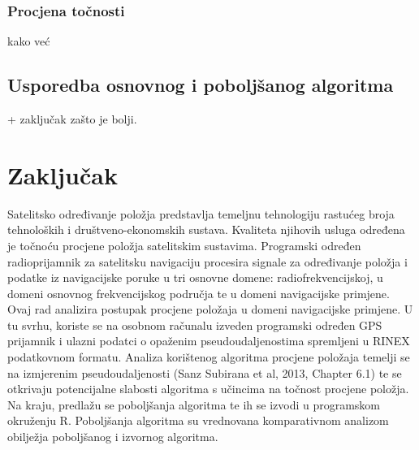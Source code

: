 \documentclass[a4paper,twoside,12pt]{memoir} %
\begin{document}
\subsubsection{Procjena točnosti}
kako već

\subsection{Usporedba osnovnog i poboljšanog algoritma} + zaključak zašto je bolji.

\section{Zaključak}






\pagestyle{empty} %


\begin{sazetak}
Satelitsko određivanje položja predstavlja temeljnu
tehnologiju rastućeg broja tehnoloških i društveno-ekonomskih sustava.
Kvaliteta njihovih
usluga određena je točnoću procjene položja
satelitskim sustavima.
Programski određen radioprijamnik za satelitsku navigaciju
procesira signale za određivanje položja i podatke
iz navigacijske poruke
u tri osnovne domene: radiofrekvencijskoj, u domeni osnovnog frekvencijskog
područja te u domeni navigacijske primjene.
Ovaj rad analizira postupak procjene položaja
u domeni navigacijske primjene. U tu svrhu, koriste se na osobnom računalu
izveden programski određen GPS prijamnik i ulazni podatci
o opaženim pseudoudaljenostima spremljeni
u RINEX podatkovnom formatu.
Analiza korištenog algoritma procjene položaja
temelji se na izmjerenim pseudoudaljenosti (Sanz Subirana et al, 2013, Chapter 6.1)
te se otkrivaju potencijalne slabosti algoritma
s učincima na točnost procjene položja. Na kraju, predlažu se poboljšanja
algoritma te ih se izvodi u programskom okruženju R. 
Poboljšanja algoritma su vrednovana komparativnom analizom obilježja
poboljšanog i izvornog algoritma.
\end{sazetak}
\end{document}
